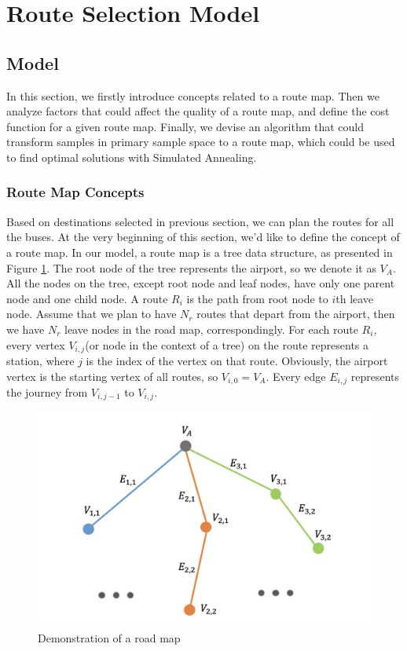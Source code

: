 \documentclass{mcmthesis}
\begin{document}
\linespread{0.6} %
\setlength{\parskip}{0.5\baselineskip} %

\section{Route Selection Model}
\subsection{Model}
In this section, we firstly introduce concepts related to a route map. Then we analyze factors that could affect the quality of a route map, and define the cost function for a given route map. Finally, we devise an algorithm that could transform samples in primary sample space to a route map, which could be used to find optimal solutions with Simulated Annealing.

\subsubsection{Route Map Concepts}
Based on destinations selected in previous section, we can plan the routes for all the buses. At the very beginning of this section, we'd like to define the concept of a route map. In our model, a route map is a tree data structure\cite{TreeStructure}, as presented in Figure \ref{roadmap_demo}. The root node of the tree represents the airport, so we denote it as $V_A$. All the nodes on the tree, except root node and leaf nodes, have only one parent node and one child node. A route $R_i$ is the path from root node to $i$th leave node. Assume that we plan to have $N_r$ routes that depart from the airport, then we have $N_r$ leave nodes in the road map, correspondingly. For each route $R_i$, every vertex $V_{i, j}$(or node in the context of a tree) on the route represents a station, where $j$ is the index of the vertex on that route. Obviously, the airport vertex is the starting vertex of all routes, so $V_{i, 0} = V_A$. Every edge $E_{i, j}$ represents the journey from $V_{i, j-1}$ to $V_{i,j}$. 

\begin{figure}[htbp]
	\centering
	\includegraphics[width=14cm]{figures/routedemo.jpg}
	\caption{Demonstration of a road map}
    \label{roadmap_demo}
\end{figure}
\end{document}
